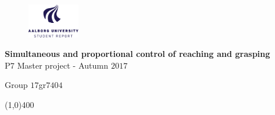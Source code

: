 \clearpage
\thispagestyle{empty}

\begin{figure}[H]
	\raggedleft
	\includegraphics[width=0.2\textwidth]{figures/aaulogo-en.png}
\end{figure} 

\vspace{5 cm}

\begin{center}
	\begin{Huge}
		\textbf{Simultaneous and proportional control of reaching and grasping}\\
		\vspace{5 mm}
		P$7$ Master project - Autumn $2017$\\
		\vspace{3 mm}
	\end{Huge}
	{\Large Group $17$gr$7404$}
\end{center}
\vspace*{\fill}

\begin{center}
	\line(1,0){400}
\end{center}

